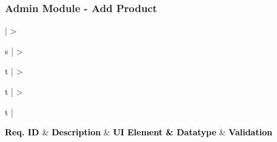 \documentclass[hidelinks,a4paper,12pt]{article}
\begin{document}
\subsubsection{Admin Module - Add Product}

\begin{center}
	{
	\setlength{\extrarowheight}{2pt}

	\newcolumntype{b}{X}
		
	\renewcommand\thetable{2} 					
	 \label{table:2}
	\vspace{0.25cm}
									
	\begin{tabularx}{\textwidth}{ | >{\ttfamily\raggedright\arraybackslash} s 
	| >{\ttfamily\raggedright\arraybackslash} t 
	| >{\ttfamily\raggedright\arraybackslash} t 	
	| >{\ttfamily\raggedright\arraybackslash} t | }
								
	\hline
								
	{\textbf{\textcolor{black}{ {Req. ID} \newline}}} & {\textbf{\textcolor{black}{ { Description}}}} & {\textbf{\textcolor{black}{ {UI Element \& Datatype}}}} & \textbf{\textcolor{black}{ {Validation}}} \\
								

\end{tabularx}}
\end{center}
\end{document}
